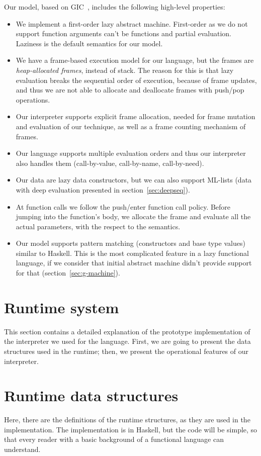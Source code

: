 \documentclass[diploma]{softlab-thesis}
\begin{document}
Our model, based on GIC~\cite{Fourtounis14}, 
includes the following high-level properties:
\begin{itemize}
  \item We implement a first-order lazy abstract machine. First-order as we do not support
  function arguments can't be functions and partial evaluation. Laziness is the default semantics
  for our model.
  \item We have a frame-based execution model for our language, but the frames are 
  \textit{heap-allocated frames}, instead of stack. The reason for this is that lazy evaluation 
  breaks the sequential order of execution, because of frame updates, and thus we are not able 
  to allocate and deallocate frames with push/pop operations.
  \item Our interpreter supports explicit frame allocation, needed for frame mutation and evaluation 
  of our technique, as well as a frame counting mechanism of frames.
  \item Our language supports multiple evaluation orders and thus our interpreter 
  also handles them (call-by-value, call-by-name, call-by-need).
  \item Our data are lazy data constructors, but we can also support ML-lists (data with deep evaluation
  presented in section~\ref{sec:deepseq}).
  \item At function calls we follow the push/enter function call policy. Before jumping into 
  the function's body, we allocate the frame and evaluate all the actual parameters, with the respect
  to the semantics. 
  \item Our model supports pattern matching (constructors and base type values) similar to Haskell. 
  This is the most complicated feature in a lazy functional language, if we consider that initial 
  abstract machine didn't provide support for that (section~\ref{sec:g-machine}).
\end{itemize}

\section {Runtime system}
\label{sec:runtime-system}

This section contains a detailed explanation of the prototype implementation of the interpreter we 
used for the language. First, we are going to present the data structures used in the runtime; then, 
we present the operational features of our interpreter. 

\section{Runtime data structures}
\label{sec:runtime-structs}
Here, there are the definitions of the runtime structures, as they are used in the implementation. The 
implementation is in Haskell, but the code will be simple, so that every reader with a basic background of a functional 
language can understand.
\end{document}
